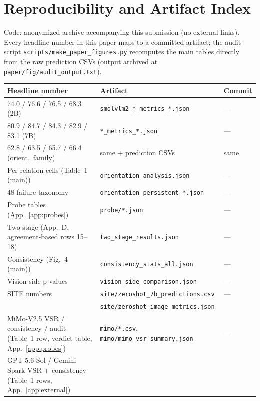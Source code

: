 \section{Reproducibility and Artifact Index}
\label{app:repro}

Code: anonymized archive accompanying this submission (no external links). Every headline number in this
paper maps to a committed artifact; the audit script
\texttt{scripts/make\_paper\_figures.py} recomputes the main tables directly
from the raw prediction CSVs (output archived at
\texttt{paper/fig/audit\_output.txt}).

\begin{table}[h]
\centering
\footnotesize
\setlength{\tabcolsep}{6pt}
\begin{tabular}{lll}
\toprule
Headline number & Artifact & Commit \\
\midrule
74.0 / 76.6 / 76.5 / 68.3 (2B) & \texttt{smolvlm2\_*\_metrics\_*.json} & --- \\
80.9 / 84.7 / 84.3 / 82.9 / 83.1 (7B) & \texttt{*\_metrics\_*.json} & --- \\
62.8 / 63.5 / 65.7 / 66.4 (orient.\ family) & same + prediction CSVs &
same \\
Per-relation cells (Table~1 (main)) & \texttt{orientation\_analysis.json} & --- \\
48-failure taxonomy & \texttt{orientation\_persistent\_*.json} & --- \\
Probe tables (App.~\ref{app:probes}) & \texttt{probe/*.json} & --- \\
Two-stage (App.~D, agreement-based rows 15--18) & \texttt{two\_stage\_results.json} & --- \\
Consistency (Fig.~4 (main)) & \texttt{consistency\_stats\_all.json} & --- \\
Vision-side p-values & \texttt{vision\_side\_comparison.json} & --- \\
SITE numbers & \texttt{site/zeroshot\_7b\_predictions.csv} & --- \\
 & \texttt{site/zeroshot\_image\_metrics.json} & \\
MiMo-V2.5 VSR / consistency / audit (Table~1 row, verdict table,
App.~\ref{app:probes}) & \texttt{mimo/*.csv}, \texttt{mimo/mimo\_vsr\_summary.json} & --- \\
GPT-5.6 Sol / Gemini Spark VSR + consistency (Table~1 rows,
App.~\ref{app:external}) &

\end{tabular}
\end{table}
